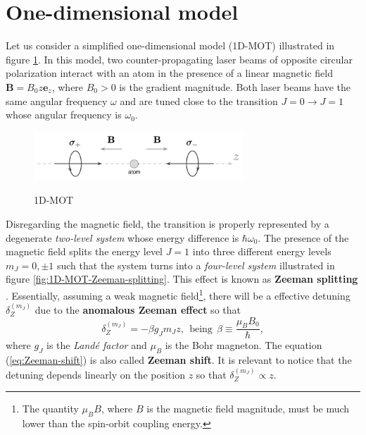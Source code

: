 %
\section{One-dimensional model}
\label{eq:one-dimensional-model}
%

Let us consider a simplified one-dimensional model (1D-MOT) illustrated in figure \ref{fig:1D-MOT}. In this model, two counter-propagating laser beams of opposite circular polarization interact with an atom in the presence of a linear magnetic field $ \mathbf{B} = B_0 z \mathbf{e}_z $, where $ B_0 > 0 $ is the gradient magnitude. Both laser beams have the same angular frequency $ \omega $ and are tuned close to the transition $ J = 0 \rightarrow J = 1 $ whose angular frequency is $ \omega_0 $.

\begin{figure}[!ht]
	\centering
	\caption{1D-MOT}
	\includegraphics[width=0.7\textwidth]{USPSC-img/1D-MOT.png}
	\vspace{5pt}
	\label{fig:1D-MOT}
	\vspace{-10pt}
\end{figure}

Disregarding the magnetic field, the transition is properly represented by a degenerate \textit{two-level system} whose energy difference is $ \hbar \omega_0 $. The presence of the magnetic field splits the energy level $ J = 1 $ into three different energy levels $ m_J = 0, \pm 1 $ such that the system turns into a \textit{four-level system} illustrated in figure \ref{fig:1D-MOT-Zeeman-splitting}. This effect is known as \textbf{Zeeman splitting} \cite[Section~7.4]{steck2007quantum}. Essentially, assuming a weak magnetic field\footnote{The quantity $ \mu_B B $, where $ B $ is the magnetic field magnitude, must be much lower than the spin-orbit coupling energy.}, there will be a effective detuning $ \delta_Z^{(m_J)} $ due to the \textbf{anomalous Zeeman effect} so that
\begin{equation}
	\delta_Z^{(m_J)} = - \beta g_{J} m_J z,\ \ \textrm{being}\ \ \beta \equiv \frac{\mu_B B_0}{\hbar},
	\label{eq:Zeeman-shift}
\end{equation}
where $ g_J $ is the \textit{Landé factor} and $ \mu_B $ is the Bohr magneton. The equation (\ref{eq:Zeeman-shift}) is also called \textbf{Zeeman shift}. It is relevant to notice that the detuning depends linearly on the position $ z $ so that $ \delta_Z^{(m_J)} \propto z $.

